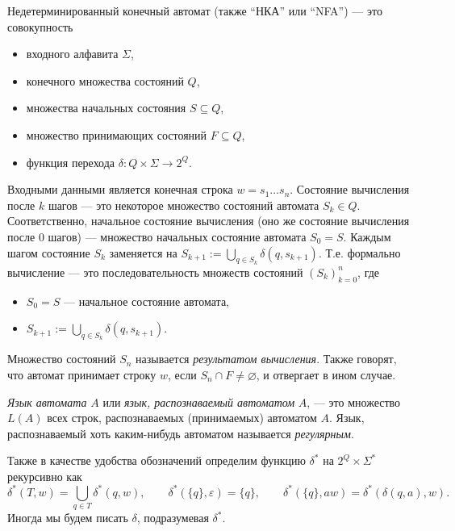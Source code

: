 \documentclass[12pt,a4paper]{article}
\begin{document}
    \begin{definition}
        Недетерминированный конечный автомат (также ``НКА'' или ``NFA'') --- это совокупность
        \begin{itemize}
            \item входного алфавита $\Sigma$,
            \item конечного множества состояний $Q$,
            \item множества начальных состояния $S \subseteq Q$,
            \item множество принимающих состояний $F \subseteq Q$,
            \item функция перехода $\delta: Q \times \Sigma \to 2^Q$.
        \end{itemize}
        Входными данными является конечная строка $w = s_1 \dots s_n$. Состояние вычисления после $k$ шагов --- это некоторое множество состояний автомата $S_k \in Q$. Соответственно, начальное состояние вычисления (оно же состояние вычисления после $0$ шагов) --- множество начальных состояние автомата $S_0 = S$. Каждым шагом состояние $S_k$ заменяется на $S_{k+1} := \bigcup_{q \in S_k} \delta(q, s_{k+1})$. Т.е. формально вычисление --- это последовательность множеств состояний $(S_k)_{k=0}^n$, где
        \begin{itemize}
            \item $S_0 = S$ --- начальное состояние автомата,
            \item $S_{k+1} := \bigcup_{q \in S_k} \delta(q, s_{k+1})$.
        \end{itemize}
        Множество состояний $S_n$ называется \emph{результатом вычисления}. Также говорят, что автомат принимает строку $w$, если $S_n \cap F \neq \varnothing$, и отвергает в ином случае.

        \emph{Язык автомата} $A$ или \emph{язык, распознаваемый автоматом} $A$, --- это множество $L(A)$ всех строк, распознаваемых (принимаемых) автоматом $A$. Язык, распознаваемый хоть каким-нибудь автоматом называется \emph{регулярным}.

        Также в качестве удобства обозначений определим функцию $\delta^*$ на $2^Q \times \Sigma^*$ рекурсивно как
        \[
            \delta^*(T, w) = \bigcup_{q \in T} \delta^*(q, w),
            \qquad
            \delta^*(\{q\}, \varepsilon) = \{q\},
            \qquad
            \delta^*(\{q\}, aw) = \delta^*(\delta(q, a), w).
        \]
        Иногда мы будем писать $\delta$, подразумевая $\delta^*$.
    \end{definition}
\end{document}
